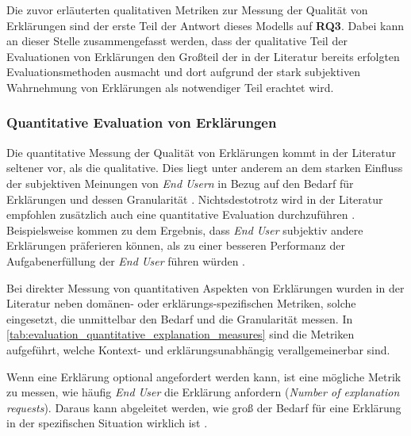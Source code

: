 \bigskip

Die zuvor erläuterten qualitativen Metriken zur Messung der Qualität von Erklärungen sind der erste Teil der Antwort dieses Modells auf \textbf{RQ3}. Dabei kann an dieser Stelle zusammengefasst werden, dass der qualitative Teil der Evaluationen von Erklärungen den Großteil der in der Literatur bereits erfolgten Evaluationsmethoden ausmacht und dort aufgrund der stark subjektiven Wahrnehmung von Erklärungen als notwendiger Teil erachtet wird.

\subsubsection{Quantitative Evaluation von Erklärungen}

Die quantitative Messung der Qualität von Erklärungen kommt in der Literatur seltener vor, als die qualitative. Dies liegt unter anderem an dem starken Einfluss der subjektiven Meinungen von \textit{End Usern} in Bezug auf den Bedarf für Erklärungen und dessen Granularität \cite{chazette_end-users_nodate, kouki_user_2017}. Nichtsdestotrotz wird in der Literatur empfohlen zusätzlich auch eine quantitative Evaluation durchzuführen \cite{balog_measuring_2020}. Beispielsweise kommen \citeauthor{wiegand2019drive} zu dem Ergebnis, dass \textit{End User} subjektiv andere Erklärungen präferieren können, als zu einer besseren Performanz der Aufgabenerfüllung der \textit{End User} führen würden \cite{wiegand2019drive}.

Bei direkter Messung von quantitativen Aspekten von Erklärungen wurden in der Literatur neben domänen- oder erklärungs-spezifischen Metriken, solche eingesetzt, die unmittelbar den Bedarf und die Granularität messen. In \autoref{tab:evaluation_quantitative_explanation_measures} sind die Metriken aufgeführt, welche Kontext- und erklärungsunabhängig verallgemeinerbar sind.

Wenn eine Erklärung optional angefordert werden kann, ist eine mögliche Metrik zu messen, wie häufig \textit{End User} die Erklärung anfordern (\textit{Number of explanation requests}). Daraus kann abgeleitet werden, wie groß der Bedarf für eine Erklärung in der spezifischen Situation wirklich ist \cite{wiegand_id_2020}.

